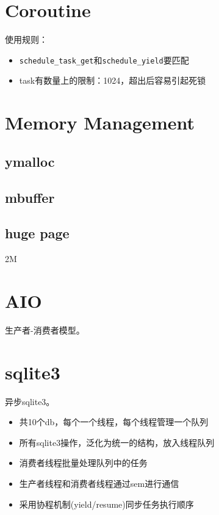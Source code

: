 \section{Coroutine}

使用规则：
\begin{itemize}
    \item \verb|schedule_task_get|和\verb|schedule_yield|要匹配
    \item task有数量上的限制：1024，超出后容易引起死锁
\end{itemize}

\section{Memory Management}

\subsection{ymalloc}

\subsection{mbuffer}

\subsection{huge page}

2M

\section{AIO}

生产者-消费者模型。

\section{sqlite3}

异步sqlite3。

\begin{itemize}
    \item 共10个db，每个一个线程，每个线程管理一个队列
    \item 所有sqlite3操作，泛化为统一的结构，放入线程队列
    \item 消费者线程批量处理队列中的任务
    \item 生产者线程和消费者线程通过sem进行通信
    \item 采用协程机制(yield/resume)同步任务执行顺序
\end{itemize}

